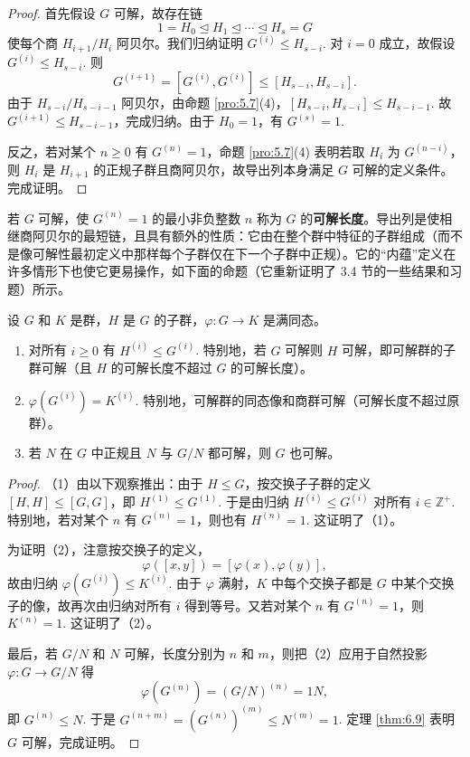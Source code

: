 \begin{proof}
首先假设 \(G\) 可解，故存在链
\[
1 = H_0 \trianglelefteq H_1 \trianglelefteq \cdots \trianglelefteq H_s = G
\]
使每个商 \(H_{i+1}/H_i\) 阿贝尔。我们归纳证明 \(G^{(i)} \leq H_{s-i}\). 对 \(i = 0\) 成立，故假设 \(G^{(i)} \leq H_{s-i}\). 则
\[
G^{(i+1)} = [G^{(i)}, G^{(i)}] \leq [H_{s-i}, H_{s-i}].
\]
由于 \(H_{s-i}/H_{s-i-1}\) 阿贝尔，由命题 \ref{pro:5.7}(4)，\([H_{s-i}, H_{s-i}] \leq H_{s-i-1}\). 故 \(G^{(i+1)} \leq H_{s-i-1}\)，完成归纳。由于 \(H_0 = 1\)，有 \(G^{(s)} = 1\).

反之，若对某个 \(n \geq 0\) 有 \(G^{(n)} = 1\)，命题 \ref{pro:5.7}(4) 表明若取 \(H_i\) 为 \(G^{(n-i)}\)，则 \(H_i\) 是 \(H_{i+1}\) 的正规子群且商阿贝尔，故导出列本身满足 \(G\) 可解的定义条件。完成证明。
\end{proof}

若 \(G\) 可解，使 \(G^{(n)} = 1\) 的最小非负整数 \(n\) 称为 \(G\) 的\textbf{可解长度}。导出列是使相继商阿贝尔的最短链，且具有额外的性质：它由在整个群中特征的子群组成（而不是像可解性最初定义中那样每个子群仅在下一个子群中正规）。它的“内蕴”定义在许多情形下也使它更易操作，如下面的命题（它重新证明了 3.4 节的一些结果和习题）所示。

\begin{proposition}\label{pro:6.10}
设 \(G\) 和 \(K\) 是群，\(H\) 是 \(G\) 的子群，\(\varphi : G \to K\) 是满同态。

\begin{enumerate}[label=(\arabic*)]
\item 对所有 \(i \geq 0\) 有 \(H^{(i)} \leq G^{(i)}\). 特别地，若 \(G\) 可解则 \(H\) 可解，即可解群的子群可解（且 \(H\) 的可解长度不超过 \(G\) 的可解长度）。
\item \(\varphi(G^{(i)}) = K^{(i)}\). 特别地，可解群的同态像和商群可解（可解长度不超过原群）。
\item 若 \(N\) 在 \(G\) 中正规且 \(N\) 与 \(G/N\) 都可解，则 \(G\) 也可解。
\end{enumerate}
\end{proposition}

\begin{proof}
（1）由以下观察推出：由于 \(H \leq G\)，按交换子子群的定义 \([H, H] \leq [G, G]\)，即 \(H^{(1)} \leq G^{(1)}\). 于是由归纳 \(H^{(i)} \leq G^{(i)}\) 对所有 \(i \in \mathbb{Z}^+\). 特别地，若对某个 \(n\) 有 \(G^{(n)} = 1\)，则也有 \(H^{(n)} = 1\). 这证明了（1）。

为证明（2），注意按交换子的定义，
\[
\varphi([x, y]) = [\varphi(x), \varphi(y)],
\]
故由归纳 \(\varphi(G^{(i)}) \leq K^{(i)}\). 由于 \(\varphi\) 满射，\(K\) 中每个交换子都是 \(G\) 中某个交换子的像，故再次由归纳对所有 \(i\) 得到等号。又若对某个 \(n\) 有 \(G^{(n)} = 1\)，则 \(K^{(n)} = 1\). 这证明了（2）。

最后，若 \(G/N\) 和 \(N\) 可解，长度分别为 \(n\) 和 \(m\)，则把（2）应用于自然投影 \(\varphi : G \to G/N\) 得
\[
\varphi(G^{(n)}) = (G/N)^{(n)} = 1N,
\]
即 \(G^{(n)} \leq N\). 于是 \(G^{(n+m)} = (G^{(n)})^{(m)} \leq N^{(m)} = 1\). 定理 \ref{thm:6.9} 表明 \(G\) 可解，完成证明。
\end{proof}

